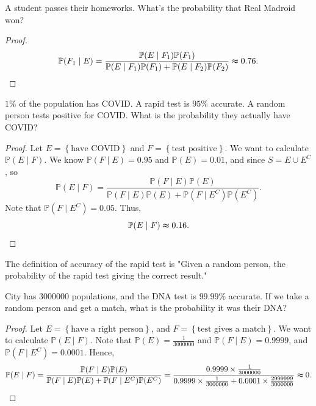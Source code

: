 \begin{eg}
    A student passes their homeworks. What's the probability that Real Madroid won?
\end{eg}
\begin{proof}
    \begin{align*}
        \mathbb{P} (F_1 \mid E) = \frac{\mathbb{P} (E \mid F_1) \mathbb{P} (F_1)}{\mathbb{P} (E \mid F_1) \mathbb{P} (F_1) + \mathbb{P} (E \mid F_2) \mathbb{P} (F_2) } \thickapprox 0.76.
    \end{align*}
\end{proof}

\begin{eg}
    \(1 \%\) of the population has COVID. A rapid test is \(95 \%\) accurate. A random person tests positive for COVID. What is the probability they actually have COVID?  
\end{eg}
\begin{proof}
    Let \(E = \left\{ \text{have COVID}  \right\} \) and \(F = \left\{ \text{test positive}  \right\} \). We want to calculate \(\mathbb{P} (E \mid F)\). We know \(\mathbb{P} (F \mid E) = 0.95\) and \(\mathbb{P} (E) = 0.01\), and since \(S = E \cup E^C\), so 
    \[
        \mathbb{P} (E \mid F) = \frac{\mathbb{P} (F \mid E) \mathbb{P} (E)}{\mathbb{P} (F \mid E) \mathbb{P} (E) + \mathbb{P} (F \mid E^C) \mathbb{P} (E^C) }.
    \]       
    Note that \(\mathbb{P} (F \mid E^C) = 0.05\). Thus,
    \[
        \mathbb{P} (E \mid F) \thickapprox 0.16.
    \] 
\end{proof}

\begin{remark}
    The definition of accuracy of the rapid test is "Given a random person, the probability of the rapid test giving the correct result."
\end{remark}

\begin{eg}
    City has \(3000000\) populations, and the DNA test is \(99.99\%\) accurate. If we take a random person and get a match, what is the probability it was their DNA? 
\end{eg}

\begin{proof}
    Let \(E = \left\{ \text{have a right person}  \right\} \), and \(F = \left\{ \text{test gives a match} \right\} \). We want to calculate \(\mathbb{P} (E \mid F)\). Note that \(\mathbb{P} (E) = \frac{1}{3000000}\) and \(\mathbb{P} (F \mid E) = 0.9999\), and \(\mathbb{P} (F \mid E^C) = 0.0001\). Hence,
    \[
        \mathbb{P} (E \mid F) = \frac{\mathbb{P} (F \mid E) \mathbb{P} (E)}{\mathbb{P} (F \mid E) \mathbb{P} (E) + \mathbb{P} (F \mid E^C) \mathbb{P} (E^C)} = \frac{0.9999 \times \frac{1}{3000000}}{0.9999 \times \frac{1}{3000000} + 0.0001 \times \frac{2999999}{3000000}} \thickapprox 0.
    \]     
\end{proof}

